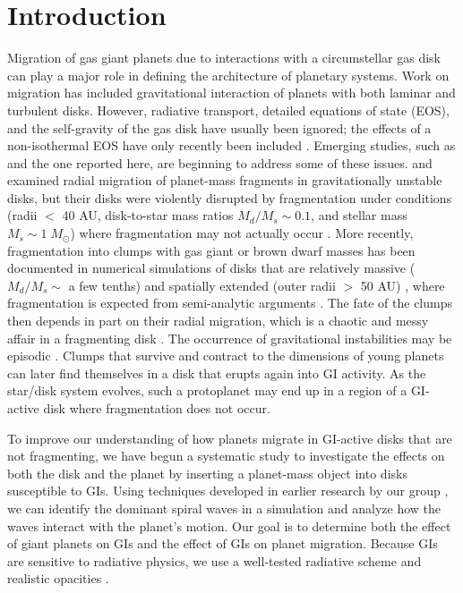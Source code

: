 \documentclass[12pt,manuscript,authoryear]{aastex}
\begin{document}
\label{firstpage}

\section{Introduction}

Migration of gas giant planets due to interactions with a circumstellar gas disk can play a major role in defining the
architecture of planetary systems. Work on migration \citep[see review by][]{papaloizou2007} has included gravitational
interaction of planets with both laminar and turbulent disks. However, radiative transport, detailed equations of state
(EOS), and the self-gravity of the gas disk have usually been ignored; the effects of a non-isothermal EOS have only
recently been included \citep[e.g.,][]{paardekooper2006,paardekooper2010,paardekooper2011}. Emerging studies, such as
\citet{baruteau2011} and the one reported here, are beginning to address some of these issues.  \citet{boss2005} and
\citet{mayer2004} examined radial migration of planet-mass fragments in gravitationally unstable disks, but their disks
were violently disrupted by fragmentation under conditions (radii $<$ 40 AU, disk-to-star mass ratios $M_d/M_s \sim
0.1$, and stellar mass $M_s \sim 1\;M_{\odot}$) where fragmentation may not actually occur
\citep{rafikov2005,rafikov2007,boley2006,boley2007b,boley2008,forgan2009,cai2010}. More recently, fragmentation into
clumps with gas giant or brown dwarf masses has been documented in numerical simulations of disks that are relatively
massive ($M_d/M_s \sim$ a few tenths) and spatially extended (outer radii $>$ 50 AU)
\citep{krumholz2007,stamatellos2007,stamatellos2009,boley2009,boley2010}, where fragmentation is expected from
semi-analytic arguments \citep[e.g.,][]{clarke2009,rafikov2009,dodson2009}. The fate of the clumps then depends in part
on their radial migration, which is a chaotic and messy affair in a fragmenting disk
\citep[e.g.,][]{boley2009,boley2010,vorobyov2010,boley2010b}. The occurrence of gravitational instabilities may be
episodic \citep[e.g.,][]{vorobyov2006,vorobyov2010b,zhu2010}. Clumps that survive and contract to the dimensions of
young planets can later find themselves in a disk that erupts again into GI activity. As the star/disk system evolves,
such a protoplanet may end up in a region of a GI-active disk where fragmentation does not occur.

To improve our understanding of how planets migrate in GI-active disks that are not fragmenting, we have begun a
systematic study to investigate the effects on both the disk and the planet by inserting a planet-mass object into disks
susceptible to GIs. Using techniques developed in earlier research by our group \citep{pickett2003,
  mejia2005,cai2008,boley2006,boley2007b,michael2010}, we can identify the dominant spiral waves in a simulation and
analyze how the waves interact with the planet's motion. Our goal is to determine both the effect of giant planets on
GIs and the effect of GIs on planet migration. Because GIs are sensitive to radiative physics, we use a well-tested
radiative scheme \citep{boley2007b} and realistic opacities \citep{dalessio2001}.
\end{document}
